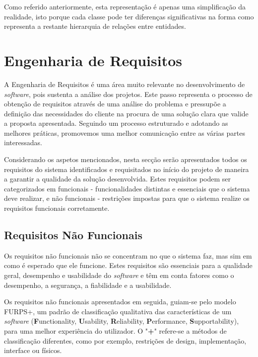 Como referido anteriormente, esta representação é apenas uma simplificação da realidade, isto
porque cada classe pode ter diferenças significativas na forma como representa a restante
hierarquia de relações entre entidades.

\section{Engenharia de Requisitos}

A Engenharia de Requisitos é uma área muito relevante no desenvolvimento de \textit{software}, pois 
sustenta a análise dos projetos. Este passo representa o processo de obtenção de requisitos através 
de uma análise do problema e pressupõe a definição das necessidades do cliente na procura de uma 
solução clara que valide a proposta apresentada. Seguindo um processo estruturado e adotando as 
melhores práticas, promovemos uma melhor comunicação entre as várias partes interessadas.

Considerando os aspetos mencionados, nesta secção serão apresentados todos os requisitos do sistema 
identificados e requisitados no início do projeto de maneira a garantir a qualidade da solução 
desenvolvida. Estes requisitos podem ser categorizados em funcionais - funcionalidades distintas 
e essenciais que o sistema deve realizar, e não funcionais - restrições impostas para que o 
sistema realize os requisitos funcionais corretamente.

\subsection{Requisitos Não Funcionais}

Os requisitos não funcionais não se concentram no que o sistema faz, mas sim em como é esperado que
ele funcione. Estes requisitos são essenciais para a qualidade geral, desempenho e usabilidade do 
\textit{software} e têm em conta fatores como o desempenho, a segurança, a fiabilidade e a 
usabilidade.

Os requisitos não funcionais apresentados em seguida, guiam-se pelo modelo FURPS+, um padrão de 
classificação qualitativa das características de um \textit{software} (\textbf{F}unctionality, 
\textbf{U}sability, \textbf{R}eliability, \textbf{P}erformance, \textbf{S}upportability), para uma 
melhor experiência do utilizador. O "\textbf{+}" refere-se a métodos de classificação diferentes, 
como por exemplo, restrições de design, implementação, interface ou físicos.

